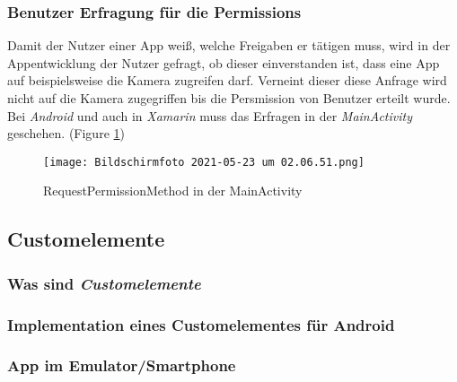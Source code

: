 \subsubsection{Benutzer Erfragung für die Permissions}
Damit der Nutzer einer App weiß, welche Freigaben er tätigen muss, wird in der Appentwicklung der Nutzer gefragt,
ob dieser einverstanden ist, dass eine App auf beispielsweise die Kamera zugreifen darf. Verneint dieser diese Anfrage
wird nicht auf die Kamera zugegriffen bis die Persmission von Benutzer erteilt wurde.
Bei \textit{Android} und auch in \textit{Xamarin} muss das Erfragen in der \textit{MainActivity} geschehen. (Figure \ref{fig:MainActivity})

\begin{figure}[h]
    \centering
    \texttt{[image: Bildschirmfoto 2021-05-23 um 02.06.51.png]}
    \label{fig:MainActivity}
    \caption{RequestPermissionMethod in der MainActivity}
\end{figure}


\subsection{Customelemente}
\subsubsection{Was sind \textit{Customelemente}}
\subsubsection{Implementation eines Customelementes für Android}
\subsubsection{App im Emulator/Smartphone}